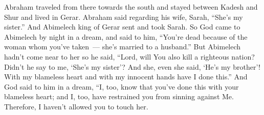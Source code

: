 
\begin{inparaenum}
     Abraham traveled from there towards the south and stayed between Kadesh and Shur and lived in Gerar.%
     Abraham said regarding his wife, Sarah, ``She's my sister.'' And Abimelech king of Gerar sent and took Sarah.%
     So God came to Abimelech by night in a dream, and said to him, ``You're dead because of the woman whom you've taken~--- she's married to a husband.''%
     But Abimelech hadn't come near to her so he said, ``Lord, will You also kill a righteous nation?%
     Didn't he say to me, `She's my sister'? And she, even she said, `He's my brother'! With my blameless heart and with my innocent hands have I done this.''%
     And God said to him in a dream, ``I, too, know that you've done this with your blameless heart; and I, too, have restrained you from sinning against Me. Therefore, I haven't allowed you to touch her.%
\end{inparaenum}
